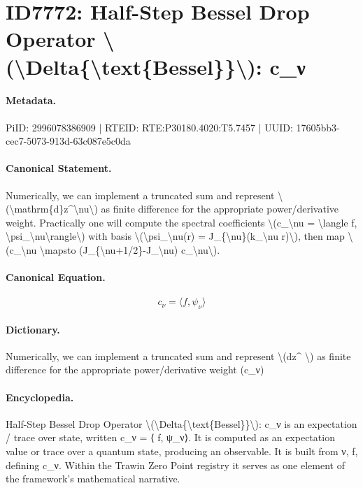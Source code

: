 \section*{ID7772: Half-Step Bessel Drop Operator \textbackslash{}(\textbackslash{}Delta\{\textbackslash{}text\{Bessel\}\}\textbackslash{}): c\_ν}
\paragraph{Metadata.}
PiID: 2996078386909 | RTEID: RTE:P30180.4020:T5.7457 | UUID: 17605bb3-cec7-5073-913d-63c087e5c0da

\paragraph{Canonical Statement.}
Numerically, we can implement a truncated sum and represent \textbackslash{}(\textbackslash{}mathrm\{d\}z\textasciicircum{}\textbackslash{}nu\textbackslash{}) as finite difference for the appropriate power/derivative weight. Practically one will compute the spectral coefficients \textbackslash{}(c\_\textbackslash{}nu = \textbackslash{}langle f, \textbackslash{}psi\_\textbackslash{}nu\textbackslash{}rangle\textbackslash{}) with basis \textbackslash{}(\textbackslash{}psi\_\textbackslash{}nu(r) = J\_\{\textbackslash{}nu\}(k\_\textbackslash{}nu r)\textbackslash{}), then map \textbackslash{}(c\_\textbackslash{}nu \textbackslash{}mapsto (J\_\{\textbackslash{}nu+1/2\}-J\_\textbackslash{}nu) c\_\textbackslash{}nu\textbackslash{}).

\paragraph{Canonical Equation.}
\[
c_\nu = \langle f, \psi_\nu\rangle
\]

\paragraph{Dictionary.}
Numerically, we can implement a truncated sum and represent \textbackslash{}(dz\textasciicircum{} \textbackslash{}) as finite difference for the appropriate power/derivative weight (c\_ν)

\paragraph{Encyclopedia.}
Half-Step Bessel Drop Operator \textbackslash{}(\textbackslash{}Delta\{\textbackslash{}text\{Bessel\}\}\textbackslash{}): c\_ν is an expectation / trace over state, written c\_ν = ⟨ f, ψ\_ν⟩. It is computed as an expectation value or trace over a quantum state, producing an observable. It is built from ν, f, defining c\_ν. Within the Trawin Zero Point registry it serves as one element of the framework's mathematical narrative.

